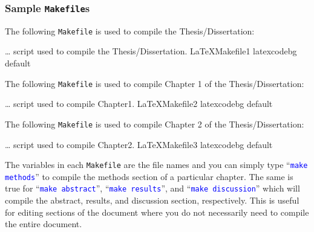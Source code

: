 \documentclass[../Dissertation]{subfiles}
\begin{document}
\subsubsection{Sample \texttt{Makefile}s}
    The following \texttt{Makefile} is used to compile the Thesis/Dissertation:
    
        {}
        {\ldots {} script used to compile the Thesis/Dissertation.}
        {LaTeXMakefile1}
        {\footnotesize}
        {latexcodebg}
        {default}
    
    The following \texttt{Makefile} is used to compile Chapter 1 of the
    Thesis/Dissertation:
    
        {}
        {\ldots {} script used to compile Chapter1.}
        {LaTeXMakefile2}
        {\footnotesize}
        {latexcodebg}
        {default}

    The following \texttt{Makefile} is used to compile Chapter 2 of the
    Thesis/Dissertation:
    
        {}
        {\ldots {} script used to compile Chapter2.}
        {LaTeXMakefile3}
        {\footnotesize}
        {latexcodebg}
        {default}

    The variables in each \texttt{Makefile} are the  file names
    and you can simply type ``\textcolor{blue}{\texttt{make
    methods}}'' to compile the methods section of a particular chapter.  The
    same is true for ``\textcolor{blue}{\texttt{make abstract}}'',
    ``\textcolor{blue}{\texttt{make results}}'', and
    ``\textcolor{blue}{\texttt{make discussion}}'' which will compile
    the abstract, results, and discussion section, respectively.  This is
    useful for editing sections of the document where you do not necessarily
    need to compile the entire document.  
    
\end{document}
